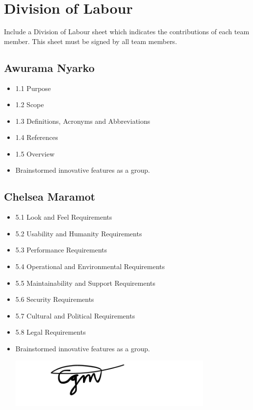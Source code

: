 \documentclass[]{article}
\begin{document}

\appendix
\section{Division of Labour}
\label{sec:division_of_labour}
Include a Division of Labour sheet which indicates the contributions of each team member. This sheet must be signed by all team members.
\subsection{Awurama Nyarko}
\label{subsec:awurama_nyarko}
\begin{itemize}
	\item 1.1 Purpose
	\item 1.2 Scope
	\item 1.3 Definitions, Acronyms and Abbreviations
	\item 1.4 References
	\item 1.5 Overview
	\item Brainstormed innovative features as a group.
\end{itemize}

\subsection{Chelsea Maramot}
\label{subsec:chelsea_maramot}
\begin{itemize}
	\item 5.1 Look and Feel Requirements
	\item 5.2 Usability and Humanity Requirements
	\item 5.3 Performance Requirements
	\item 5.4 Operational and Environmental Requirements
	\item 5.5 Maintainability and Support Requirements
	\item 5.6 Security Requirements
	\item 5.7 Cultural and Political Requirements
	\item 5.8 Legal Requirements
	\item Brainstormed innovative features as a group.

	      \includegraphics[width=0.8\textwidth]{chelsea.png}
\end{itemize}
\end{document}
